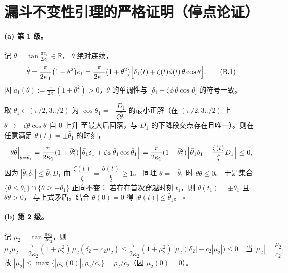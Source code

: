 \documentclass[11pt,a4paper]{article}
\newcommand{\ub}{\underline{b}}
\theoremstyle{plain}
\theoremstyle{definition}
\theoremstyle{remark}
\begin{document}
\section{漏斗不变性引理的严格证明（停点论证）}\label{app:strict}
\paragraph{(a) 第 1 级。} 记 $\theta=\tan\frac{\pi e_1}{2\kappa_1}\in\mathbb R$，
$\theta$ 绝对连续，
\begin{equation}
\dot\theta=\frac{\pi}{2\kappa_1}\bigl(1+\theta^2\bigr)\dot e_1
=\frac{\pi}{2\kappa_1}\bigl(1+\theta^2\bigr)
\Bigl[\delta_1(t)+\zeta(t)\phi(t)\,\theta\cos\theta\Bigr].
\label{eq:B1}\tag{B.1}
\end{equation}
因 $a_1(\theta):=\frac{\pi}{2\kappa_1}(1+\theta^2)>0$，$\theta$ 的单调性与
$\bigl[\delta_1+\zeta\phi\,\theta\cos\theta\bigr]$ 的符号一致。

取 $\bar\theta_1\in(\pi/2,3\pi/2)$ 为 $\cos\bar\theta_1=-\dfrac{D_1}{\zeta\bar\theta_1}$
的最小正解（在 $(\pi/2,3\pi/2)$ 上 $\theta\mapsto-\zeta\theta\cos\theta$ 自 $0$ 上升
至最大后回落，与 $D_1$ 的下降段交点存在且唯一）。则在任意满足
$\theta(t)=\pm\bar\theta_1$ 的时刻，
\begin{equation*}
\theta\dot\theta\Big|_{\theta=\bar\theta_1}
=\frac{\pi}{2\kappa_1}(1+\bar\theta_1^2)
\Bigl[\bar\theta_1\delta_1+\zeta\phi\,\bar\theta_1\cos\bar\theta_1\Bigr]
=\frac{\pi}{2\kappa_1}(1+\bar\theta_1^2)
\Bigl[\bar\theta_1\delta_1-\frac{\zeta(t)}{\zeta}D_1\Bigr]\le0,
\end{equation*}
因为 $|\bar\theta_1\delta_1|\le\bar\theta_1D_1$ 而
$\dfrac{\zeta(t)}{\zeta}=\dfrac{b(t)}{\ub}\ge1$。
同理 $\theta=-\bar\theta_1$ 时 $\theta\dot\theta\le0$。
于是集合 $\{\theta\le\bar\theta_1\}\cap\{\theta\ge-\bar\theta_1\}$ 正向不变：
若存在首次穿越时刻 $t_1$，则 $\theta(t_1)=\pm\bar\theta_1$ 且 $\theta\dot\theta>0$，
与上式矛盾。结合 $\theta(0)=0$ 得 $|\theta(t)|\le\bar\theta_1$。
\hfill$\square$

\paragraph{(b) 第 2 级。} 记 $\mu_2=\tan\frac{\pi e_2}{2\kappa_2}$，则
\begin{equation*}
\mu_2\dot\mu_2=\frac{\pi}{2\kappa_2}(1+\mu_2^2)\,\mu_2(\delta_2-c_2\mu_2)
\le\frac{\pi}{2\kappa_2}(1+\mu_2^2)\,|\mu_2|\bigl(|\delta_2|-c_2|\mu_2|\bigr)\le0
\quad\text{当}\ |\mu_2|=\frac{\rho_2}{c_2},
\end{equation*}
故 $|\mu_2|\le\max\{|\mu_2(0)|,\rho_2/c_2\}=\rho_2/c_2$（因 $\mu_2(0)=0$）。
\hfill$\square$
\end{document}
